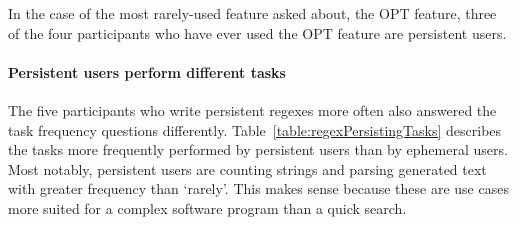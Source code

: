 In the case of the most rarely-used feature asked about, the OPT feature, three of the four participants who have ever used the OPT feature are persistent users.

\paragraph{Persistent users perform different tasks} The five participants who write persistent regexes more often also answered the task frequency questions differently.  Table~\ref{table:regexPersistingTasks} describes the tasks more frequently performed by persistent users than by ephemeral users.  Most notably, persistent users are counting strings and parsing generated text with greater frequency than `rarely'.  This makes sense because these are use cases more suited for a complex software program than a quick search.










